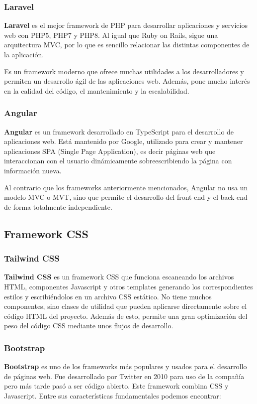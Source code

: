     \subsubsection{Laravel}
    \textbf{Laravel} \cite{laravel} es el mejor framework de PHP para desarrollar aplicaciones
    y servicios web con PHP5, PHP7 y PHP8. Al igual que Ruby on Rails, sigue una arquitectura 
    MVC, por lo que es sencillo relacionar las distintas componentes de la aplicación.

    Es un framework moderno que ofrece muchas utilidades a los desarrolladores y permiten un
    desarrollo ágil de las aplicaciones web. Además, pone mucho interés en la calidad del
    código, el mantenimiento y la escalabilidad.

    \subsubsection{Angular}
    \textbf{Angular} \cite{angular} es un framework desarrollado en TypeScript para el
    desarrollo de aplicaciones web. Está mantenido por Google, utilizado para crear y mantener
    aplicaciones SPA (Single Page Application), es decir páginas web que interaccionan con el
    usuario dinámicamente sobreescribiendo la página con información nueva.

    Al contrario que los frameworks anteriormente mencionados, Angular no usa un modelo MVC
    o MVT, sino que permite el desarrollo del front-end y el back-end de forma totalmente
    independiente.

\subsection{Framework CSS}

    \subsubsection{Tailwind CSS}
    \textbf{Tailwind CSS} \cite{tailwind-css} es un framework CSS que funciona escaneando los
    archivos HTML, componentes Javascript y otros templates generando los correspondientes
    estilos y escribiéndolos en un archivo CSS estático. No tiene muchos componentes, sino
    clases de utilidad que pueden aplicarse directamente sobre el código HTML del proyecto.
    Además de esto, permite una gran optimización del peso del código CSS mediante unos flujos
    de desarrollo.

        
    \subsubsection{Bootstrap}
    \textbf{Bootstrap} \cite{bootstrap} es uno de los frameworks más populares y usados para
    el desarrollo de páginas web. Fue desarrollado por Twitter en 2010 para uso de la compañía
    pero más tarde pasó a ser código abierto. Este framework combina CSS y Javascript. Entre
    sus características fundamentales podemos encontrar:
    
